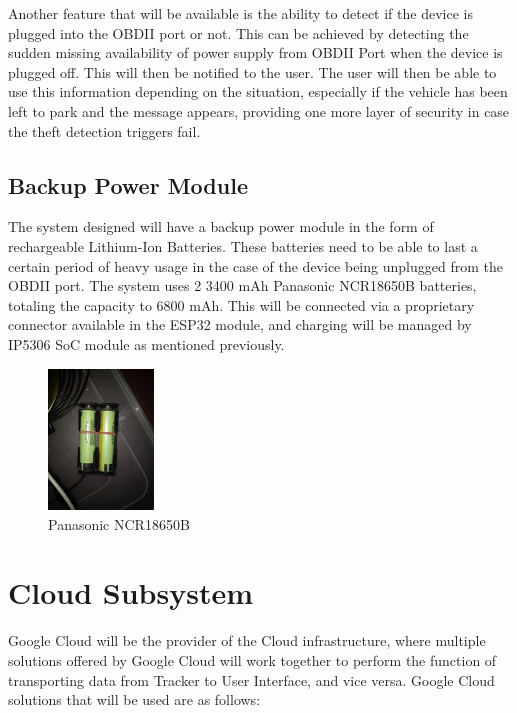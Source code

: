 \documentclass[conference]{IEEEtran}
\begin{document}
Another feature that will be available is the ability to detect if the device is plugged into the OBDII port or not. This can be achieved by detecting the sudden missing availability of 
power supply from OBDII Port when the device is plugged off. This will then be notified to the user. The user will then be able to use this information depending on the situation, especially if 
the vehicle has been left to park and the message appears, providing one more layer of security in case the theft detection triggers fail.


\subsection{Backup Power Module}
The system designed will have a backup power module in the form of rechargeable Lithium-Ion Batteries. These batteries need to be able to last a certain period of heavy usage in the case of the device being unplugged from the OBDII port. 
The system uses 2 3400 mAh Panasonic NCR18650B batteries, totaling the capacity to 6800 mAh. This will be connected via a proprietary connector available in the ESP32 module, and charging will be managed by IP5306 SoC module as mentioned 
previously. 
\begin{figure}[htbp]
    \centering
    \includegraphics[width=0.25\textwidth]{bateri}
    \caption{Panasonic NCR18650B}
    \label{fig1}
\end{figure}

\section{Cloud Subsystem}
Google Cloud will be the provider of the Cloud infrastructure, where multiple solutions offered by Google Cloud will work together to perform the function of transporting data from Tracker to User Interface, and vice versa. 
Google Cloud solutions that will be used are as follows:
\end{document}
